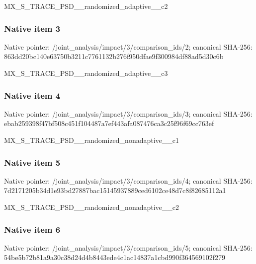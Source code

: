 \documentclass[10pt,a4paper]{article}
\begin{document}
\begingroup\raggedright\sloppy MX\_\allowbreak{}S\_\allowbreak{}TRACE\_\allowbreak{}PSD\_\allowbreak{}\_\allowbreak{}randomized\_\allowbreak{}adaptive\_\allowbreak{}\_\allowbreak{}c2\par\endgroup

\subsubsection{Native item 3}
Native pointer: /joint\_\allowbreak{}analysis/impact/3/comparison\_\allowbreak{}ids/2; canonical SHA-256: 863dd20bc140e63750b3211c7761132b276f950dfae9f300984df88ad5d30c6b

\begingroup\raggedright\sloppy MX\_\allowbreak{}S\_\allowbreak{}TRACE\_\allowbreak{}PSD\_\allowbreak{}\_\allowbreak{}randomized\_\allowbreak{}adaptive\_\allowbreak{}\_\allowbreak{}c3\par\endgroup

\subsubsection{Native item 4}
Native pointer: /joint\_\allowbreak{}analysis/impact/3/comparison\_\allowbreak{}ids/3; canonical SHA-256: ebab259398f47bf508c451f104487a7ef443afa087476ca3c25f96f69cc763ef

\begingroup\raggedright\sloppy MX\_\allowbreak{}S\_\allowbreak{}TRACE\_\allowbreak{}PSD\_\allowbreak{}\_\allowbreak{}randomized\_\allowbreak{}nonadaptive\_\allowbreak{}\_\allowbreak{}c1\par\endgroup

\subsubsection{Native item 5}
Native pointer: /joint\_\allowbreak{}analysis/impact/3/comparison\_\allowbreak{}ids/4; canonical SHA-256: 7d2171205b34d1e93bd27887bac15145937889ced6102ce48d7c8f82685112a1

\begingroup\raggedright\sloppy MX\_\allowbreak{}S\_\allowbreak{}TRACE\_\allowbreak{}PSD\_\allowbreak{}\_\allowbreak{}randomized\_\allowbreak{}nonadaptive\_\allowbreak{}\_\allowbreak{}c2\par\endgroup

\subsubsection{Native item 6}
Native pointer: /joint\_\allowbreak{}analysis/impact/3/comparison\_\allowbreak{}ids/5; canonical SHA-256: 54be5b72b81a9a30c38d24d4b8443ede4c1ac14837a1cbd990f364569102f279
\end{document}
